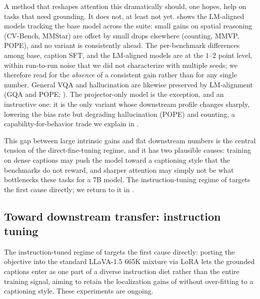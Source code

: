 A method that reshapes attention this dramatically should, one hopes, help on tasks that need grounding. It does not, at least not yet.  shows the LM-aligned models tracking the base model across the suite: small gains on spatial reasoning (CV-Bench, MMStar) are offset by small drops elsewhere (counting, MMVP, POPE), and no variant is consistently ahead. The per-benchmark differences among base, caption SFT, and the LM-aligned models are at the $1$--$2$ point level, within run-to-run noise that we did not characterize with multiple seeds; we therefore read  for the \emph{absence} of a consistent gain rather than for any single number. General VQA and hallucination are likewise preserved by LM-alignment (GQA and POPE; ). The projector-only model is the exception, and an instructive one: it is the only variant whose downstream profile changes sharply, lowering the bias rate but degrading hallucination (POPE) and counting, a capability-for-behavior trade we explain in .

This gap between large intrinsic gains and flat downstream numbers is the central tension of the direct-fine-tuning regime, and it has two plausible causes: training on dense captions may push the model toward a captioning style that the benchmarks do not reward, and sharper attention may simply not be what bottlenecks these tasks for a 7B model. The instruction-tuning regime of  targets the first cause directly; we return to it in .

\subsection{Toward downstream transfer: instruction tuning}
\label{sec:results-it}
The instruction-tuned regime of  targets the first cause directly: porting the objective into the standard LLaVA-1.5 665K mixture via LoRA lets the grounded captions enter as one part of a diverse instruction diet rather than the entire training signal, aiming to retain the localization gains of  without over-fitting to a captioning style. These experiments are ongoing.
